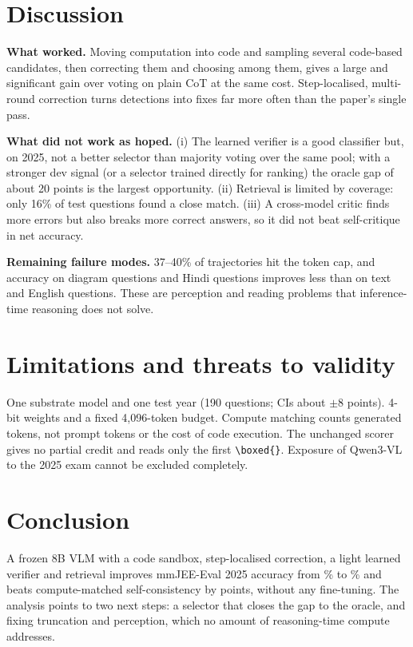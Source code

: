 \documentclass[conference]{IEEEtran}
\begin{document}
\section{Discussion}
\textbf{What worked.} Moving computation into code and sampling several code-based candidates,
then correcting them and choosing among them, gives a large and significant gain over voting on
plain CoT at the same cost. Step-localised, multi-round correction turns detections into fixes
far more often than the paper's single pass.

\textbf{What did not work as hoped.} (i) The learned verifier is a good classifier but, on 2025,
not a better selector than majority voting over the same pool; with a stronger dev signal (or a
selector trained directly for ranking) the oracle gap of about 20 points is the largest
opportunity. (ii) Retrieval is limited by coverage: only 16\% of test questions found a close
match. (iii) A cross-model critic finds more errors but also breaks more correct answers, so it
did not beat self-critique in net accuracy.

\textbf{Remaining failure modes.} 37--40\% of trajectories hit the token cap, and accuracy on
diagram questions and Hindi questions improves less than on text and English questions. These
are perception and reading problems that inference-time reasoning does not solve.

\section{Limitations and threats to validity}
One substrate model and one test year (190 questions; CIs about $\pm$8 points). 4-bit weights and
a fixed 4{,}096-token budget. Compute matching counts generated tokens, not prompt tokens or the
cost of code execution. The unchanged scorer gives no partial credit and reads only the first
\verb|\boxed{}|. Exposure of Qwen3-VL to the 2025 exam cannot be excluded completely.

\section{Conclusion}
A frozen 8B VLM with a code sandbox, step-localised correction, a light learned verifier and
retrieval improves mmJEE-Eval 2025 accuracy from \BaseAcc\% to \FullAcc\% and beats
compute-matched self-consistency by \FullVsSc{} points, without any fine-tuning. The analysis
points to two next steps: a selector that closes the gap to the oracle, and fixing truncation and
perception, which no amount of reasoning-time compute addresses.
\end{document}
